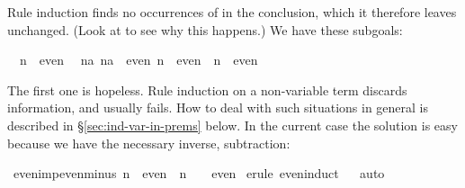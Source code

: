 \begin{isabellebody}
%
\isadelimproof
%
\endisadelimproof
%
\isatagproof
%
\begin{isamarkuptxt}%
Rule induction finds no occurrences of  in the
conclusion, which it therefore leaves unchanged.  (Look at
 to see why this happens.)  We have these subgoals:
\begin{isabelle}%
\ {}{}\ n\ {}\ even\isanewline
\ {}{}\ {}na{}\ {}na\ {}\ even{}\ n\ {}\ even{}\ {}\ n\ {}\ even%
\end{isabelle}
The first one is hopeless.  Rule induction on
a non-variable term discards information, and usually fails.
How to deal with such situations
in general is described in {\S}\ref{sec:ind-var-in-prems} below.
In the current case the solution is easy because
we have the necessary inverse, subtraction:%
\end{isamarkuptxt}%
\isamarkuptrue%
%
\endisatagproof
{\isafoldproof}%
%
\isadelimproof
%
\endisadelimproof
{}\isamarkupfalse%
\ even{}imp{}even{}minus{}{}{}\ {}n\ {}\ even\ {}\ n\ {}\ {}\ {}\ even{}\isanewline
%
\isadelimproof
%
\endisadelimproof
%
\isatagproof
{}\isamarkupfalse%
\ {}erule\ even{}induct{}\isanewline
\ \isamarkupfalse%
\ auto\isanewline
{}\isamarkupfalse%
%
\endisatagproof
{\isafoldproof}%
%
\isadelimproof
%
\endisadelimproof
%
\isadelimproof
%
\endisadelimproof
%
\isatagproof
%
\begin{isamarkuptxt}%

\end{isamarkuptxt}
\end{isabellebody}
